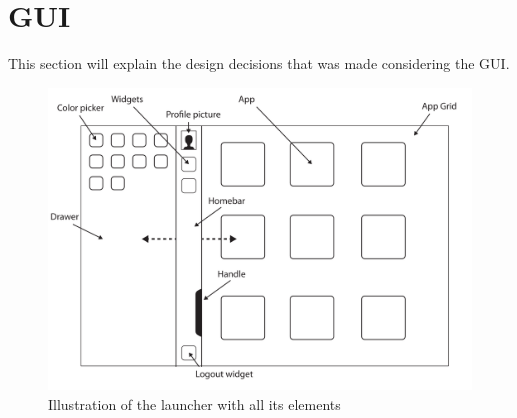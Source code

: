 \section{GUI}
\label{GUI}
This section will explain the design decisions that was made considering the GUI.

\begin{figure}[h!]
	\centering
	\includegraphics[scale=0.2]{gfx/design_prototype.pdf}
	\caption{Illustration of the launcher with all its elements}
	\label{fig:buttons}
\end{figure}




